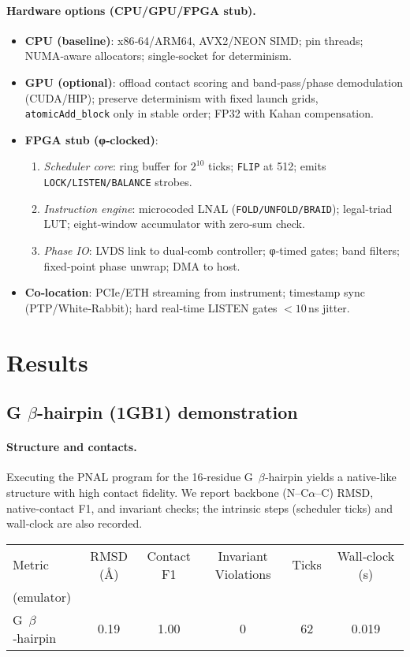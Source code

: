 \documentclass[12pt,a4paper]{article}
\begin{document}
\paragraph{Hardware options (CPU/GPU/FPGA stub).}
\begin{itemize}
  \item \textbf{CPU (baseline)}: x86‑64/ARM64, AVX2/NEON SIMD; pin threads; NUMA‑aware allocators; single‑socket for determinism.
  \item \textbf{GPU (optional)}: offload contact scoring and band‑pass/phase demodulation (CUDA/HIP); preserve determinism with fixed launch grids, \texttt{atomicAdd\_block} only in stable order; FP32 with Kahan compensation.
  \item \textbf{FPGA stub (φ‑clocked)}: 
  \begin{enumerate}
    \item \emph{Scheduler core}: ring buffer for $2^{10}$ ticks; \texttt{FLIP} at 512; emits \texttt{LOCK/LISTEN/BALANCE} strobes.
    \item \emph{Instruction engine}: microcoded LNAL (\texttt{FOLD/UNFOLD/BRAID}); legal‑triad LUT; eight‑window accumulator with zero‑sum check.
    \item \emph{Phase IO}: LVDS link to dual‑comb controller; φ‑timed gates; band filters; fixed‑point phase unwrap; DMA to host.
  \end{enumerate}
  \item \textbf{Co‑location}: PCIe/ETH streaming from instrument; timestamp sync (PTP/White‑Rabbit); hard real‑time LISTEN gates $<10$\,ns jitter.
\end{itemize}

\section{Results}

\subsection{G \texorpdfstring{$\beta$}{beta}-hairpin (1GB1) demonstration}
\paragraph{Structure and contacts.}
Executing the PNAL program for the 16‑residue G~$\beta$‑hairpin yields a native‑like structure with high contact fidelity. We report backbone (N–C$\alpha$–C) RMSD, native‑contact F1, and invariant checks; the intrinsic steps (scheduler ticks) and wall‑clock are also recorded.
\begin{center}
\renewcommand{\arraystretch}{1.15}
\begin{tabular}{@{}lccccc@{}}
\toprule
Metric & RMSD (Å) & Contact F1 & Invariant Violations & Ticks & Wall‑clock (s)\\\small (emulator) \\
\midrule
G~$\beta$‑hairpin & 0.19 & 1.00& 0 & 62 & 0.019 \\
\bottomrule
\end{tabular}
\end{center}
\end{document}
